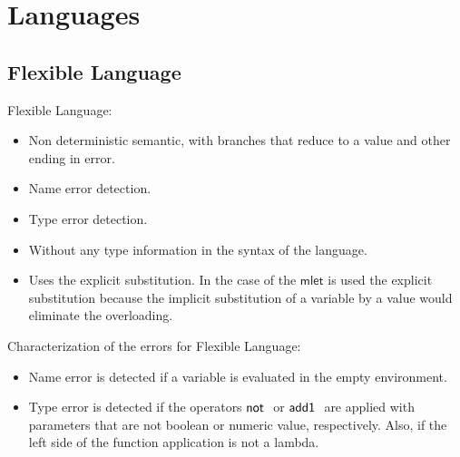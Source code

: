 \documentclass[preprint,authoryear,sort&compress,9pt,nocopyrightspace]{article}
\newcommand{\negacion}[1]{\mathsf{not} \ #1}
\newcommand{\suma}[1]{\mathsf{add1} \ #1}
\newcommand{\semanticA}{Flexible Language}
\begin{document}
\section{Languages}

\subsection{\semanticA}

\semanticA:
\begin{itemize}
\item Non deterministic semantic, with branches that reduce to a value and other ending in error.
\item Name error detection.
\item Type error detection.
\item Without any type information in the syntax of the language.
\item Uses the explicit substitution. In the case of the $\mathsf{mlet}$ is used the explicit substitution because the implicit substitution of a variable by a value would eliminate the overloading.
\end{itemize} 
Characterization of the errors for \semanticA:

\begin{itemize}
\item Name error is detected if a variable is evaluated in the empty environment.
\item Type error is detected if the operators $\negacion$ or $\suma$ are applied with parameters that are not boolean or numeric value, respectively. Also, if the left side of the function application is not a lambda.
\end{itemize}
\end{document}
